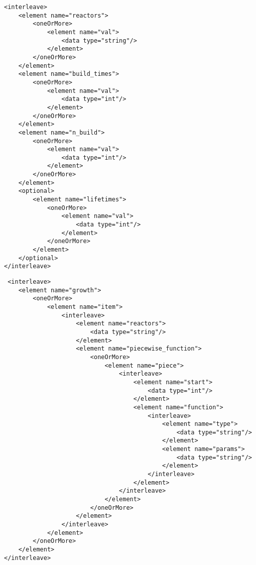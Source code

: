 \documentclass[11pt,letterpaper]{article}
\newenvironment{code}{\captionsetup{type=listing}}{}
\begin{document}
\begin{code}
\begin{verbatim}
<interleave>
    <element name="reactors">
        <oneOrMore>
            <element name="val">
                <data type="string"/>
            </element>
        </oneOrMore>
    </element>
    <element name="build_times">
        <oneOrMore>
            <element name="val">
                <data type="int"/>
            </element>
        </oneOrMore>
    </element>
    <element name="n_build">
        <oneOrMore>
            <element name="val">
                <data type="int"/>
            </element>
        </oneOrMore>
    </element>
    <optional>
        <element name="lifetimes">
            <oneOrMore>
                <element name="val">
                    <data type="int"/>
                </element>
            </oneOrMore>
        </element>
    </optional>
</interleave>
\end{verbatim}
\label{code:man_reac}
\end{code}

\begin{code}

\begin{verbatim}
 <interleave>
    <element name="growth">
        <oneOrMore>
            <element name="item">
                <interleave>
                    <element name="reactors">
                        <data type="string"/>
                    </element>
                    <element name="piecewise_function">
                        <oneOrMore>
                            <element name="piece">
                                <interleave>
                                    <element name="start">
                                        <data type="int"/>
                                    </element>
                                    <element name="function">
                                        <interleave>
                                            <element name="type">
                                                <data type="string"/>
                                            </element>
                                            <element name="params">
                                                <data type="string"/>
                                            </element>
                                        </interleave>
                                    </element>
                                </interleave>
                            </element>
                        </oneOrMore>
                    </element>
                </interleave>
            </element>
        </oneOrMore>
    </element>
</interleave>
\end{verbatim}
\label{code:fun_reac}
\end{code}
\end{document}
